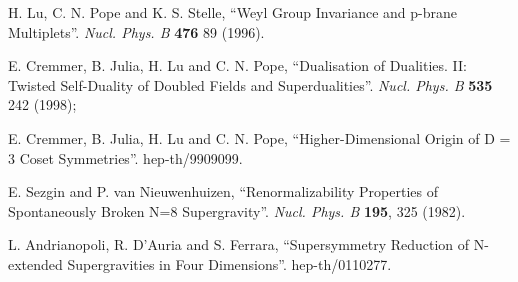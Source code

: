 \documentclass[a4paper,12pt]{article}
\begin{document}
\begin{thebibliography}{99}
H. Lu, C. N. Pope and K. S. Stelle, ``Weyl Group Invariance and
p-brane Multiplets''. {\it Nucl.  Phys. B} {\bf 476} 89 (1996).


E. Cremmer, B. Julia, H. Lu and C. N. Pope, ``Dualisation of
Dualities. II: Twisted Self-Duality of Doubled Fields  and
Superdualities''. {\it Nucl. Phys.  B} {\bf 535} 242 (1998);

E. Cremmer, B. Julia, H. Lu and C. N. Pope, ``Higher-Dimensional
Origin of D = 3 Coset Symmetries''. hep-th/9909099.



E. Sezgin and P. van Nieuwenhuizen, ``Renormalizability Properties
of Spontaneously Broken N=8 Supergravity''. {\it Nucl. Phys.  B}
{\bf 195}, 325 (1982).


L. Andrianopoli, R. D'Auria and S. Ferrara, ``Supersymmetry
Reduction of N-extended Supergravities in Four  Dimensions''.
hep-th/0110277.


\end{thebibliography}
\end{document}
